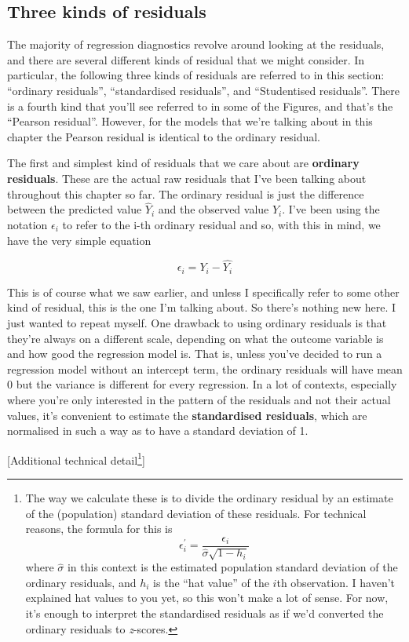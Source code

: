 \documentclass[
  a4paper,
]{book}
\begin{document}
\hypertarget{three-kinds-of-residuals}{%
\subsection{Three kinds of residuals}\label{three-kinds-of-residuals}}

The majority of regression diagnostics revolve around looking at the
residuals, and there are several different kinds of residual that we
might consider. In particular, the following three kinds of residuals
are referred to in this section: ``ordinary residuals'', ``standardised
residuals'', and ``Studentised residuals''. There is a fourth kind that
you'll see referred to in some of the Figures, and that's the ``Pearson
residual''. However, for the models that we're talking about in this
chapter the Pearson residual is identical to the ordinary residual.

The first and simplest kind of residuals that we care about are
\textbf{ordinary residuals}. These are the actual raw residuals that
I've been talking about throughout this chapter so far. The ordinary
residual is just the difference between the predicted value
\(\hat{Y}_i\) and the observed value \(Y_i\). I've been using the
notation \(\epsilon_i\) to refer to the i-th ordinary residual and so,
with this in mind, we have the very simple equation

\[\epsilon_i=Y_i-\hat{Y_i}\]

This is of course what we saw earlier, and unless I specifically refer
to some other kind of residual, this is the one I'm talking about. So
there's nothing new here. I just wanted to repeat myself. One drawback
to using ordinary residuals is that they're always on a different scale,
depending on what the outcome variable is and how good the regression
model is. That is, unless you've decided to run a regression model
without an intercept term, the ordinary residuals will have mean 0 but
the variance is different for every regression. In a lot of contexts,
especially where you're only interested in the pattern of the residuals
and not their actual values, it's convenient to estimate the
\textbf{standardised residuals}, which are normalised in such a way as
to have a standard deviation of 1.

{[}Additional technical detail\footnote{The way we calculate these is to
  divide the ordinary residual by an estimate of the (population)
  standard deviation of these residuals. For technical reasons, the
  formula for this is
  \[\epsilon_i^{'}=\frac{\epsilon_i}{\hat{\sigma}\sqrt{1-h_i}}\] where
  \(\hat{\sigma}\) in this context is the estimated population standard
  deviation of the ordinary residuals, and \(h_i\) is the ``hat value''
  of the \(i\)th observation. I haven't explained hat values to you yet,
  so this won't make a lot of sense. For now, it's enough to interpret
  the standardised residuals as if we'd converted the ordinary residuals
  to \emph{z}-scores.}{]}
\end{document}
